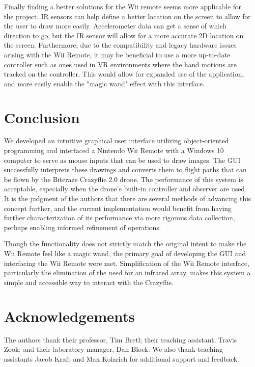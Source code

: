 \documentclass[conf]{new-aiaa}
\begin{document}
        Finally finding a better solutions for the Wii remote seems more applicable for the project. IR sensors can help define a better location on the screen to allow for the user to draw more easily. Accelerometer data can get a sense of which direction to go, but the IR sensor will allow for a more accurate 2D location on the screen. Furthermore, due to the compatibility and legacy hardware issues arising with the Wii Remote, it may be beneficial to use a more up-to-date controller such as ones used in VR environments where the hand motions are tracked on the controller. This would allow for expanded use of the application, and more easily enable the "magic wand" effect with this interface. 

\section{Conclusion} %
    We developed an intuitive graphical user interface utilizing object-oriented programming and interfaced a Nintendo Wii Remote with a Windows 10 computer to serve as mouse inputs that can be used to draw images. The GUI successfully interprets these drawings and converts them to flight paths that can be flown by the Bitcraze Crazyflie 2.0 drone. The performance of this system is acceptable, especially when the drone's built-in controller and observer are used. It is the judgment of the authors that there are several methods of advancing this concept further, and the current implementation would benefit from having further characterization of its performance via more rigorous data collection, perhaps enabling informed refinement of operations.
    
    Though the functionality does not strictly match the original intent to make the Wii Remote feel like a magic wand, the primary goal of developing the GUI and interfacing the Wii Remote were met. Simplification of the Wii Remote interface, particularly the elimination of the need for an infrared array, makes this system a simple and accessible way to interact with the Crazyflie.

\section{Acknowledgements}
    The authors thank their professor, Tim Bretl; their teaching assistant, Travis Zook; and their laboratory manager, Dan Block. We also thank teaching assistants Jacob Kraft and Max Kolarich for additional support and feedback.




\end{document}
